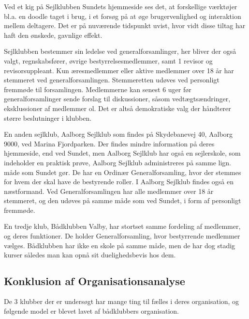 Ved et kig på Sejlklubben Sundets hjemmeside \citep{SundetUdlaan} ses det, at forskellige værktøjer bl.a. en doodle
taget i brug, i et forsøg på at øge brugervenlighed og interaktion mellem deltagere. Det er på nuværende tidspunkt
uvist, hvor vidt disse tiltag har haft den ønskede, gavnlige effekt.

Sejlklubben bestemmer sin ledelse ved generalforsamlinger, her bliver der også valgt, regnskabsfører, øvrige
bestyrrelsesmedlemmer, samt 1 revisor og revisorsuppleant. Kun æresmedlemmer eller aktive medlemmer over 18 år har
stemmeret ved generalforsamlingen. Stemmeretten udøves ved personligt fremmøde til forsamlingen. Medlemmerne kan senest
6 uger før generalforsamlinger sende forslag til diskussioner, såsom vedtægtsændringer, eksklussioner af medlemmer ol.
Det er altså demokratiske valg der håndterer større beslutninger i klubben.

En anden sejlklub, Aalborg Sejlklub som findes på Skydebanevej 40, Aalborg 9000, ved Marina Fjordparken. Der findes
mindre information på deres hjemmeside, end ved Sundet, men Aalborg Sejlklub har også en sejlerskole, som indeholder en
praktisk prøve,  Aalborg Sejlklub administreres på samme lign. måde som Sundet gør. De har en
Ordinær Generalforsamling, hvor der stemmes for hvem der skal have de bestyrende roller. I Aalborg Sejlklub findes også en næstformand. Ved Generalforsamlingen har alle medlemmer over 18
år stemmeret, og den udøves på samme måde som ved Sundet, i form af personligt fremmøde.\citep{AalborgSejlklub}

En tredje klub, Bådklubben Valby, har stortset samme fordeling af medlemmer, og deres funktioner. De holder Generalforsamling, hvor bestyrrende medlemmer vælges. Bådklubben har ikke en skole på samme måde, men de har dog stadig kurser således man kan opnå sit duelighedsbevis hos dem.\citep{BaadklubbenValby}


\subsection{Konklusion af Organisationsanalyse}

De 3 klubber der er undersøgt har mange ting til fælles i deres organisation, og følgende model er blevet lavet af bådklubbers organisation. 


